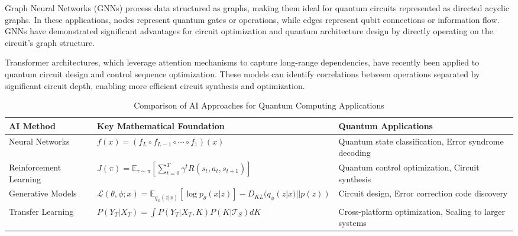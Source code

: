 Graph Neural Networks (GNNs) process data structured as graphs, making them ideal for quantum circuits represented as directed acyclic graphs. In these applications, nodes represent quantum gates or operations, while edges represent qubit connections or information flow. GNNs have demonstrated significant advantages for circuit optimization and quantum architecture design by directly operating on the circuit's graph structure.

Transformer architectures, which leverage attention mechanisms to capture long-range dependencies, have recently been applied to quantum circuit design and control sequence optimization. These models can identify correlations between operations separated by significant circuit depth, enabling more efficient circuit synthesis and optimization.

\begin{table}[!t]
\centering
\caption{Comparison of AI Approaches for Quantum Computing Applications}
\label{tab:ai_comparison}
\begin{tabular}{@{}p{2.5cm}p{2.5cm}p{2.5cm}@{}}
\toprule
\textbf{AI Method} & \textbf{Key Mathematical Foundation} & \textbf{Quantum Applications} \\
\midrule
Neural Networks & $f(x) = (f_L \circ f_{L-1} \circ \cdots \circ f_1)(x)$ & Quantum state classification, Error syndrome decoding \\
\midrule
Reinforcement Learning & $J(\pi) = \mathbb{E}_{\tau \sim \pi}\left[\sum_{t=0}^{T} \gamma^t R(s_t, a_t, s_{t+1})\right]$ & Quantum control optimization, Circuit synthesis \\
\midrule
Generative Models & $\mathcal{L}(\theta, \phi; x) = \mathbb{E}_{q_\phi(z|x)}[\log p_\theta(x|z)] - D_{KL}(q_\phi(z|x) || p(z))$ & Circuit design, Error correction code discovery \\
\midrule
Transfer Learning & $P(Y_T | X_T) = \int P(Y_T | X_T, K) P(K | \mathcal{T}_S) dK$ & Cross-platform optimization, Scaling to larger systems \\
\bottomrule
\end{tabular}
\end{table}

